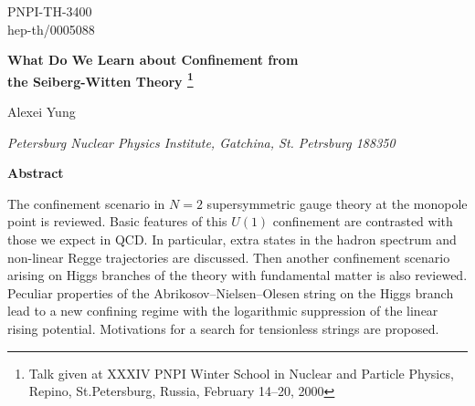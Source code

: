\documentclass[a4paper,12pt]{article}
\begin{document}
\renewcommand{\theequation}{\thesection.\arabic{equation}}

\begin{titlepage}
\renewcommand{\thefootnote}{\fnsymbol{footnote}}

\begin{flushright}
PNPI-TH-3400\\
hep-th/0005088\\

\end{flushright}

\vfil

\begin{center}
\baselineskip20pt
{\bf \Large  What Do We Learn about Confinement from \\
the Seiberg-Witten Theory \footnote{Talk given at XXXIV PNPI
Winter School in Nuclear and Particle Physics,
 Repino, St.Petersburg, Russia, February 14--20, 2000}}
\end{center}
\vfil

\begin{center}
{\large   Alexei Yung}

\vspace{0.3cm}


{\it Petersburg Nuclear Physics Institute, Gatchina, St. Petrsburg
188350}

\vfil

{\large\bf Abstract} \vspace*{.25cm}
\end{center}

The confinement scenario in $N=2$ supersymmetric gauge theory at
the monopole point is reviewed. Basic features of this
$U(1)$ confinement are contrasted with those we expect in QCD.
In particular, extra states in the hadron spectrum and
non-linear Regge trajectories are discussed. Then another
confinement scenario arising on Higgs branches of the theory
with fundamental matter is also reviewed.
Peculiar properties of the Abrikosov--Nielsen--Olesen string on
the Higgs branch lead to a new confining regime with the
logarithmic suppression of the linear rising potential.
Motivations for a search for tensionless strings are proposed.



\vfil

\end{titlepage}

\newpage
\end{document}
